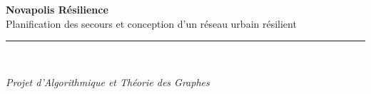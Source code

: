 \documentclass[11pt,a4paper]{article}
\begin{document}
\begin{titlepage}
    \vspace{0.8cm}
    
    {\huge\bfseries\color{primaryblue} Novapolis Résilience}\\[0.3cm]
    {\Large Planification des secours et conception d'un réseau urbain résilient}\par
    
    \vspace{0.4cm}
    \textcolor{rulecolor}{\rule{0.6\textwidth}{0.8pt}}\\[0.4cm]
    {\large\itshape Projet d'Algorithmique et Théorie des Graphes\par}
    
    \vspace{1.5cm}
    
    
    \vfill
\end{titlepage}

\tableofcontents
\newpage


\newpage


\newpage


\newpage


\newpage


\newpage


\end{document}
